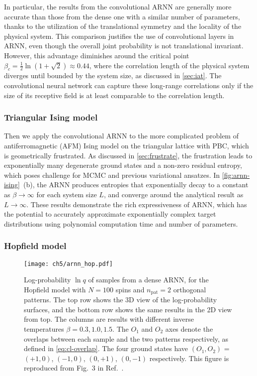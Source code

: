 In particular, the results from the convolutional ARNN are generally more accurate than those from the dense one with a similar number of parameters, thanks to the utilization of the translational symmetry and the locality of the physical system. This comparison justifies the use of convolutional layers in ARNN, even though the overall joint probability is not translational invariant. However, this advantage diminishes around the critical point $\beta_c = \frac{1}{2} \ln(1 + \sqrt{2}) \approx 0.44$, where the correlation length of the physical system diverges until bounded by the system size, as discussed in \cref{sec:iat}. The convolutional neural network can capture these long-range correlations only if the size of its receptive field is at least comparable to the correlation length.

\subsubsection{Triangular Ising model}
\label{sec:arnn-tri-ising}

Then we apply the convolutional ARNN to the more complicated problem of antiferromagnetic (AFM) Ising model on the triangular lattice with PBC, which is geometrically frustrated. As discussed in \cref{sec:frustrate}, the frustration leads to exponentially many degenerate ground states and a non-zero residual entropy, which poses challenge for MCMC and previous variational ansatzes. In \cref{fig:arnn-ising}~(b), the ARNN produces entropies that exponentially decay to a constant as $\beta \to \infty$ for each system size $L$, and converge around the analytical result as $L \to \infty$. These results demonstrate the rich expressiveness of ARNN, which has the potential to accurately approximate exponentially complex target distributions using polynomial computation time and number of parameters.

\subsubsection{Hopfield model}
\label{sec:arnn-hop}

\begin{figure}[htb]
\centering
\texttt{[image: ch5/arnn\_hop.pdf]}
\caption[ARNN results of Hopfield model]{
Log-probability $\ln q$ of samples from a dense ARNN, for the Hopfield model with $N = 100$ spins and $n_\text{pat} = 2$ orthogonal patterns.
The top row shows the 3D view of the log-probability surfaces, and the bottom row shows the same results in the 2D view from top.
The columns are results with different inverse temperatures $\beta = 0.3, 1.0, 1.5$.
The $O_1$ and $O_2$ axes denote the overlaps between each sample and the two patterns respectively, as defined in \cref{eq:cl-overlap}.
The four ground states have $(O_1, O_2)$ = $(+1, 0)$, $(-1, 0)$, $(0, +1)$, $(0, -1)$ respectively.
This figure is reproduced from Fig.~3 in Ref.~\cite{wu2019solving}.
}
\label{fig:arnn-hop}
\end{figure}

